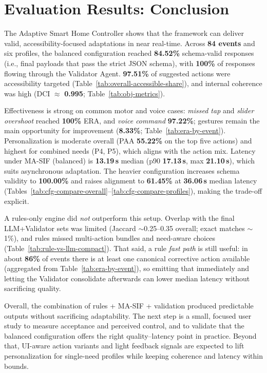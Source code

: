 \section{Evaluation Results: Conclusion}
The Adaptive Smart Home Controller shows that the framework can deliver valid, accessibility-focused adaptations in near real-time. Across \textbf{84 events} and six profiles, the balanced configuration reached \textbf{84.52\%} schema-valid responses (i.e., final payloads that pass the strict JSON schema), with \textbf{100\%} of responses flowing through the Validator Agent. \textbf{97.51\%} of suggested actions were accessibility targeted (Table~\ref{tab:overall-accessible-share}), and internal coherence was high (DCI $\approx$ \textbf{0.995}; Table~\ref{tab:obj-metrics}).

Effectiveness is strong on common motor and voice cases: \emph{missed tap} and \emph{slider overshoot} reached \textbf{100\%} ERA, and \emph{voice command} \textbf{97.22\%}; gestures remain the main opportunity for improvement (\textbf{8.33\%}; Table~\ref{tab:era-by-event}). Personalization is moderate overall (PAA \textbf{55.22\%} on the top five actions) and highest for combined needs (P4, P5), which aligns with the action mix. Latency under MA-SIF (balanced) is \textbf{13.19\,s} median (p90 \textbf{17.13\,s}, max \textbf{21.10\,s}), which suits asynchronous adaptation. The heavier configuration increases schema validity to \textbf{100.00\%} and raises alignment to \textbf{61.45\%} at \textbf{36.06\,s} median latency (Tables~\ref{tab:cfg-compare-overall}–\ref{tab:cfg-compare-profiles}), making the trade-off explicit.

A rules-only engine did \emph{not} outperform this setup. Overlap with the final LLM+Validator sets was limited (Jaccard $\sim$0.25–0.35 overall; exact matches $\sim$1\%), and rules missed multi-action bundles and need-aware choices (Table~\ref{tab:rule-vs-llm-compact}). That said, a rule \emph{fast path} is still useful: in about \textbf{86\%} of events there is at least one canonical corrective action available (aggregated from Table~\ref{tab:era-by-event}), so emitting that immediately and letting the Validator consolidate afterwards can lower median latency without sacrificing quality.

Overall, the combination of rules + MA-SIF + validation produced predictable outputs without sacrificing adaptability. The next step is a small, focused user study to measure acceptance and perceived control, and to validate that the balanced configuration offers the right quality–latency point in practice. Beyond that, UI-aware action variants and light feedback signals are expected to lift personalization for single-need profiles while keeping coherence and latency within bounds.


